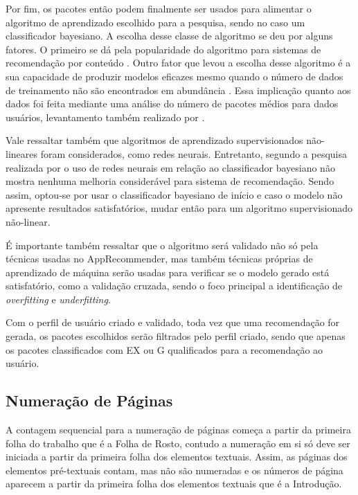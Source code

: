 Por fim, os pacotes então podem finalmente ser usados para alimentar o algoritmo de aprendizado escolhido para a pesquisa, sendo no caso um
classificador bayesiano. A escolha desse classe de algoritmo se deu por alguns fatores. O primeiro se dá pela popularidade do algoritmo para
sistemas de recomendação por conteúdo \cite{amatriain2011data}. Outro fator que levou a escolha desse algoritmo é a sua capacidade de produzir
modelos eficazes mesmo quando o número de dados de treinamento não são encontrados em abundância \cite{segaran2007programming}. Essa implicação
quanto aos dados foi feita mediante uma análise do número de pacotes médios para dados usuários, levantamento também realizado por \cite{araujo2011apprecommender}.

Vale ressaltar também que algoritmos de aprendizado supervisionados não-lineares foram considerados, como redes neurais. Entretanto, segundo
a pesquisa realizada por \cite{pazzani1997learning} o uso de redes neurais em relação ao classificador bayesiano não mostra nenhuma melhoria
considerável para sistema de recomendação. Sendo assim, optou-se por usar o classificador bayesiano de início e caso o modelo não apresente
resultados satisfatórios, mudar então para um algoritmo supervisionado não-linear.

É importante também ressaltar que o algoritmo será validado não só pela técnicas usadas no AppRecommender, mas também técnicas próprias de
aprendizado de máquina serão usadas para verificar se o modelo gerado está satisfatório, como a validação cruzada, sendo o foco principal a
identificação de \textit{overfitting} e \textit{underfitting}.

Com o perfil de usuário criado e validado, toda vez que uma recomendação for gerada, os pacotes escolhidos serão filtrados pelo perfil criado,
sendo que apenas os pacotes classificados com EX ou G qualificados para a recomendação ao usuário.
        

\subsection{Numeração de Páginas}

A contagem sequencial para a numeração de páginas começa a partir da 
primeira folha do trabalho que é a Folha de Rosto, contudo a numeração em 
si só deve ser iniciada a partir da primeira folha dos elementos textuais. 
Assim, as páginas dos elementos pré-textuais contam, mas não são numeradas 
e os números de página aparecem a partir da primeira folha dos elementos 
textuais que é a Introdução. 

